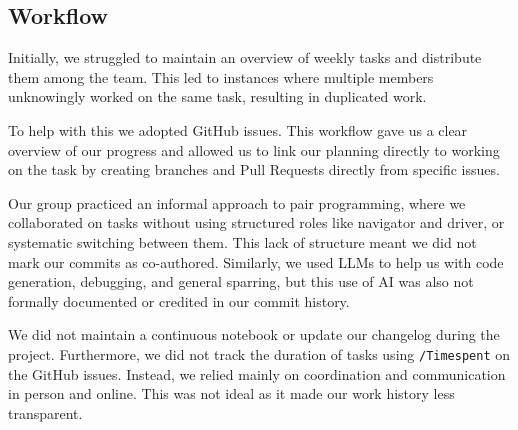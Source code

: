 \subsection{Workflow}
\noindent Initially, we struggled to maintain an overview of weekly tasks and distribute them among the team. This led to instances where multiple members unknowingly worked on the same task, resulting in duplicated work.\newline

\noindent To help with this we adopted GitHub issues. This workflow gave us a clear overview of our progress and allowed us to link our planning directly to working on the task by creating branches and Pull Requests directly from specific issues. \newline

\noindent Our group practiced an informal approach to pair programming, where we collaborated on tasks without using structured roles like navigator and driver, or systematic switching between them. This lack of structure meant we did not mark our commits as co-authored. Similarly, we used LLMs to help us with code generation, debugging, and general sparring, but this use of AI was also not formally documented or credited in our commit history.\newline

\noindent \noindent We did not maintain a continuous notebook or update our changelog during the project. Furthermore, we did not track the duration of tasks using \texttt{/Timespent} on the GitHub issues. Instead, we relied mainly on coordination and communication in person and online. This was not ideal as it made our work history less transparent.
